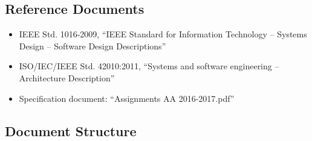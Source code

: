 \documentclass[english]{article}
\begin{document}
\subsection{Reference Documents}

\begin{itemize}
	\item{IEEE Std. 1016-2009, “IEEE Standard for Information Technology -- Systems Design -- Software Design Descriptions”}
	\item{ISO/IEC/IEEE Std. 42010:2011, “Systems and software engineering -- Architecture Description”}
	\item{Specification document: “Assignments AA 2016-2017.pdf”}
\end{itemize}

\newpage{}

\subsection{Document Structure}

\end{document}
